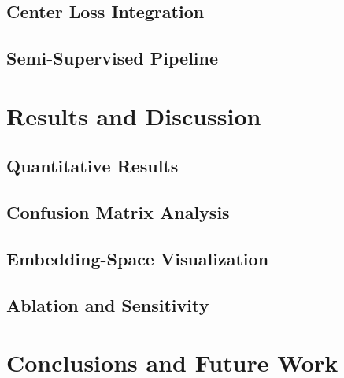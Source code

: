 \documentclass[12pt, a4paper, oneside]{teza-upb_en}
\begin{document}
\section{Center Loss Integration}

\section{Semi-Supervised Pipeline}

\chapter{Results and Discussion}
\section{Quantitative Results}

\section{Confusion Matrix Analysis}

\section{Embedding-Space Visualization}

\section{Ablation and Sensitivity}

\chapter{Conclusions and Future Work}



\end{document}
